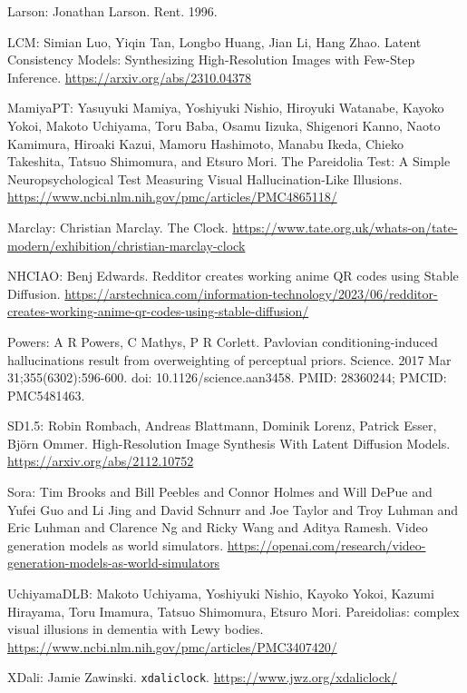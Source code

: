 \documentclass{article}
\begin{document}
Larson: Jonathan Larson. Rent. 1996.

LCM: Simian Luo, Yiqin Tan, Longbo Huang, Jian Li, Hang Zhao. Latent Consistency Models: Synthesizing High-Resolution Images with Few-Step Inference. \url{https://arxiv.org/abs/2310.04378}

MamiyaPT: Yasuyuki Mamiya, Yoshiyuki Nishio, Hiroyuki Watanabe, Kayoko Yokoi, Makoto Uchiyama, Toru Baba, Osamu Iizuka, Shigenori Kanno, Naoto Kamimura, Hiroaki Kazui, Mamoru Hashimoto, Manabu Ikeda, Chieko Takeshita, Tatsuo Shimomura, and Etsuro Mori. The Pareidolia Test: A Simple Neuropsychological Test Measuring Visual Hallucination-Like Illusions. \url{https://www.ncbi.nlm.nih.gov/pmc/articles/PMC4865118/}

Marclay: Christian Marclay. The Clock. \url{https://www.tate.org.uk/whats-on/tate-modern/exhibition/christian-marclay-clock}

NHCIAO: Benj Edwards. Redditor creates working anime QR codes using Stable Diffusion. \url{https://arstechnica.com/information-technology/2023/06/redditor-creates-working-anime-qr-codes-using-stable-diffusion/}

Powers: A R Powers, C Mathys, P R Corlett. Pavlovian conditioning-induced hallucinations result from overweighting of perceptual priors. Science. 2017 Mar 31;355(6302):596-600. doi: 10.1126/science.aan3458. PMID: 28360244; PMCID: PMC5481463.

SD1.5: Robin Rombach, Andreas Blattmann, Dominik Lorenz, Patrick Esser, Bj\"orn Ommer. High-Resolution Image Synthesis With Latent Diffusion Models. \url{https://arxiv.org/abs/2112.10752}

Sora: Tim Brooks and Bill Peebles and Connor Holmes and Will DePue and Yufei Guo and Li Jing and David Schnurr and Joe Taylor and Troy Luhman and Eric Luhman and Clarence Ng and Ricky Wang and Aditya Ramesh. Video generation models as world simulators. \url{https://openai.com/research/video-generation-models-as-world-simulators}

UchiyamaDLB: Makoto Uchiyama, Yoshiyuki Nishio, Kayoko Yokoi, Kazumi Hirayama, Toru Imamura, Tatsuo Shimomura, Etsuro Mori. Pareidolias: complex visual illusions in dementia with Lewy bodies. \url{https://www.ncbi.nlm.nih.gov/pmc/articles/PMC3407420/}

XDali: Jamie Zawinski. \texttt{xdaliclock}. \url{https://www.jwz.org/xdaliclock/}
\end{document}
